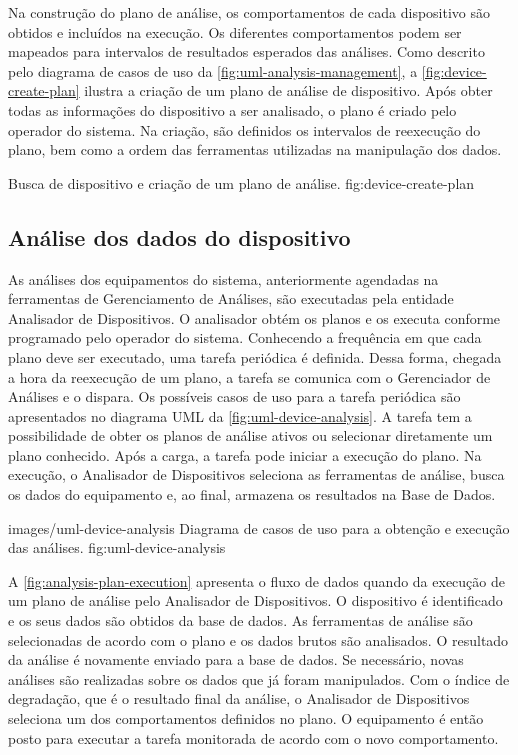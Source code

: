 Na construção do plano de análise, os comportamentos de cada dispositivo são obtidos e incluídos na
execução. Os diferentes comportamentos podem ser mapeados para intervalos de resultados esperados
das análises. Como descrito pelo diagrama de casos de uso da \cref{fig:uml-analysis-management}, a
\cref{fig:device-create-plan} ilustra a criação de um plano de análise de dispositivo. Após obter
todas as informações do dispositivo a ser analisado, o plano é criado pelo operador do sistema. Na
criação, são definidos os intervalos de reexecução do plano, bem como a ordem das ferramentas
utilizadas na manipulação dos dados.

  {Busca de dispositivo e criação de um plano de análise.}
  {fig:device-create-plan}


\subsection{Análise dos dados do dispositivo}

As análises dos equipamentos do sistema, anteriormente agendadas na ferramentas de Gerenciamento de
Análises, são executadas pela entidade Analisador de Dispositivos. O analisador obtém os planos e os
executa conforme programado pelo operador do sistema. Conhecendo a frequência em que cada plano deve
ser executado, uma tarefa periódica é definida. Dessa forma, chegada a hora da reexecução de um
plano, a tarefa se comunica com o Gerenciador de Análises e o dispara. Os possíveis casos de uso
para a tarefa periódica são apresentados no diagrama \gls{UML} da \cref{fig:uml-device-analysis}. A
tarefa tem a possibilidade de obter os planos de análise ativos ou selecionar diretamente um plano
conhecido. Após a carga, a tarefa pode iniciar a execução do plano. Na execução, o Analisador de
Dispositivos seleciona as ferramentas de análise, busca os dados do equipamento e, ao final,
armazena os resultados na Base de Dados.

  {images/uml-device-analysis}
  {Diagrama de casos de uso para a obtenção e execução das análises.}
  {fig:uml-device-analysis}

A \cref{fig:analysis-plan-execution} apresenta o fluxo de dados quando da execução de um plano de
análise pelo Analisador de Dispositivos. O dispositivo é identificado e os seus dados são obtidos da
base de dados. As ferramentas de análise são selecionadas de acordo com o plano e os dados brutos
são analisados. O resultado da análise é novamente enviado para a base de dados. Se necessário,
novas análises são realizadas sobre os dados que já foram manipulados. Com o índice de degradação,
que é o resultado final da análise, o Analisador de Dispositivos seleciona um dos comportamentos
definidos no plano. O equipamento é então posto para executar a tarefa monitorada de acordo com o
novo comportamento.

